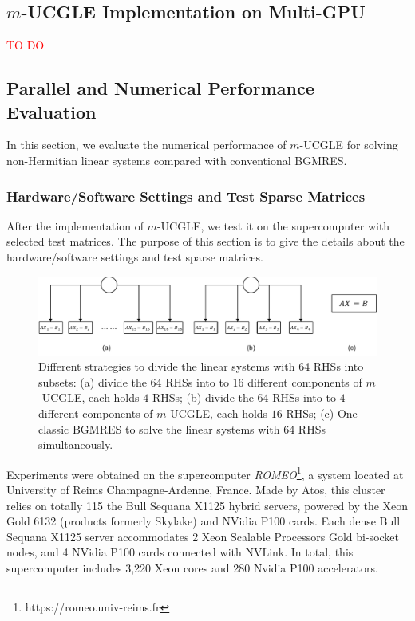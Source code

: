 \subsection{$m$-UCGLE Implementation on Multi-GPU}

\textcolor{red}{TO DO}

\subsection{Parallel and Numerical Performance Evaluation}

In this section, we evaluate the numerical performance of $m$-UCGLE for solving non-Hermitian linear systems compared with conventional BGMRES.

\subsubsection{Hardware/Software Settings  and Test Sparse Matrices}\label{hardware}

After the implementation of $m$-UCGLE, we test it on the supercomputer with selected test matrices. The purpose of this section is to give the details about the hardware/software settings and test sparse matrices.

\begin{figure}[htbp]
	\centering
	\includegraphics[width=6.4in]{fig/alloc.pdf}
	\caption{Different strategies to divide the linear systems with 64 RHSs into subsets: (a) divide the 64 RHSs into to $16$ different components of $m$-UCGLE, each holds $4$ RHSs; (b) divide the 64 RHSs into to $4$ different components of $m$-UCGLE, each holds $16$ RHSs; (c) One classic BGMRES to solve the linear systems with 64 RHSs simultaneously.}
	\label{fig:alloc}
\end{figure}

Experiments were obtained on the supercomputer \textit{ROMEO}\footnote{https://romeo.univ-reims.fr}, a system located at University of Reims Champagne-Ardenne, France. Made by Atos, this cluster relies on totally 115 the Bull Sequana X1125 hybrid servers, powered by the Xeon Gold 6132 (products formerly Skylake) and NVidia P100 cards. Each dense Bull Sequana X1125 server accommodates 2 Xeon Scalable Processors Gold bi-socket nodes, and 4 NVidia P100 cards connected with NVLink. In total, this supercomputer includes 3,220 Xeon cores and 280 Nvidia P100 accelerators.

